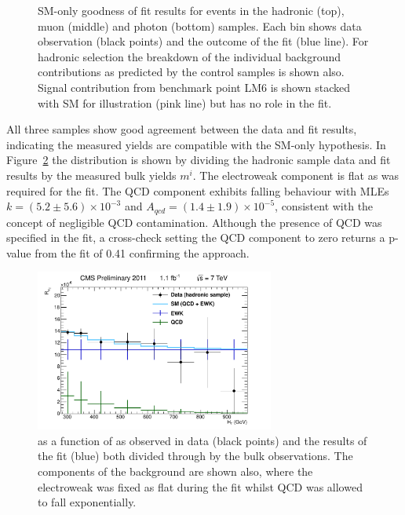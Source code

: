 \begin{figure}[htbp]
\begin{center}
     \caption{\label{fig:fit} SM-only goodness of fit results for events in the hadronic (top), muon (middle) and photon (bottom) samples. Each \scalht bin shows data observation (black points) and the outcome of the fit (blue line). For hadronic selection the breakdown of the individual background contributions as predicted by the control samples is shown also. Signal contribution from benchmark point LM6 is shown stacked with SM for illustration (pink line) but has no role in the fit.}
   \end{center}
 \end{figure}
 
 All three samples show good agreement between the data and fit results, indicating the measured yields are compatible with the SM-only hypothesis. In Figure~\ref{fig:fitrat} the \RaT distribution is shown by dividing the hadronic sample data and fit results by the measured bulk yields $m^{i}$. The electroweak component is flat as was required for the fit. The QCD component exhibits falling behaviour with MLEs $k = (5.2 \pm 5.6) \times 10^{-3}$ and $A_{qcd} = (1.4 \pm 1.9) \times 10^{-5}$, consistent with the concept of negligible QCD contamination. Although the presence of QCD was specified in the fit, a cross-check setting the QCD component to zero returns a p-value from the fit of 0.41 confirming the approach. 
 
 \begin{figure}[htbp]
   \begin{center}
      \includegraphics[width = 0.70\textwidth]{Figures/Analysis/PAS/stats_plots/RQcdFallingExp/hadronic_signal_alphaT_ratio.pdf}
     \caption{\label{fig:fitrat} \RaT as a function of \scalht as observed in data (black points) and the results of the fit (blue) both divided through by the bulk observations. The components of the background are shown also, where the electroweak was fixed as flat during the fit whilst QCD was allowed to fall exponentially. }
   \end{center}
 \end{figure}
 
